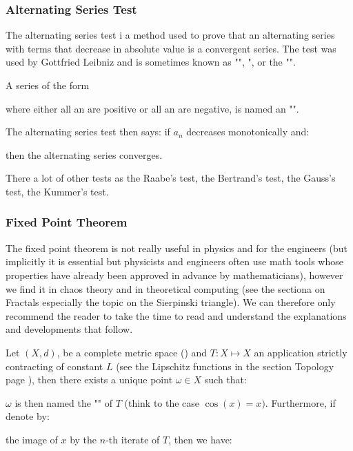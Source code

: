 	\subsubsection{Alternating Series Test}
	The alternating series test i a method used to prove that an alternating series with terms that decrease in absolute value is a convergent series. The test was used by Gottfried Leibniz and is sometimes known as "", ", or the "".
	
	A series of the form
	
	where either all an are positive or all an are negative, is named an "".

	The alternating series test then says: if $a_n$ decreases monotonically and:
	
 	then the alternating series converges.
	
	There a lot of other tests as the Raabe's test, the Bertrand's test, the Gauss's test, the Kummer's test.
	
	\subsubsection{Fixed Point Theorem}
	The fixed point theorem is not really useful in physics and for the engineers (but implicitly it is essential but physicists and engineers often use math tools whose properties have already been approved in advance by mathematicians), however we find it in chaos theory and in theoretical computing (see the sectiona on Fractals especially the topic on the Sierpinski triangle). We can therefore only recommend the reader to take the time to read and understand the explanations and developments that follow.
	
	Let $(X,d)$, be a complete metric space () and $T:X\mapsto X$ an application strictly contracting of constant $L$ (see the Lipschitz functions in the section Topology page \pageref{lipschitz functions}), then there exists a unique point $\omega\in X$ such that:
	
	$\omega$ is then named the "" of $T$ (think to the case $\cos(x)=x)$. Furthermore, if denote by:
	
	the image of $x$ by the $n$-th iterate of $T$, then we have:
	
